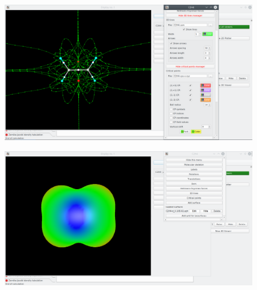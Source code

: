 \documentclass[a4paper,10pt]{article}
\begin{document}
\begin{minipage}{.5\linewidth}
\begin{figure}[H]
\caption{\label{fig:43}}
\begin{center}
\includegraphics[width=0.95\linewidth]{damqt_QS_fig43.png}
\end{center}
\end{figure} 
\end{minipage}
\begin{minipage}{.5\linewidth}
\begin{figure}[H]
\caption{\label{fig:44}}
\begin{center}
\includegraphics[width=0.95\linewidth]{damqt_QS_fig44.png}
\end{center}
\end{figure} 
\end{minipage}
\end{document}
